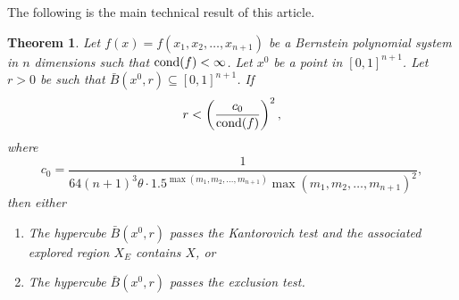 \documentclass{article}
\newcommand{\cond}[1]{\mathop{\rm{cond}}(#1)}
\newtheorem{theorem}{Theorem}[section]
\begin{document}
The following is the main technical result of this article.
\begin{theorem}
\label{thm2} Let $f(x)=f(x_1,x_2,\ldots,x_{n+1})$ be a Bernstein polynomial system in $n$ dimensions such that $\cond{f}<\infty$.
Let $x^0$ be a point in $[0,1]^{n+1}$.
Let $r > 0$ be such that $\bar{B}(x^0,r) \subseteq [0,1]^{n+1}$. If
\begin{equation}
\label{deltahatcond}
r < \left(\frac{c_0}{\cond{f}}\right)^2,
\end{equation}
where
\begin{equation}
c_0=\frac{1}{64(n+1)^3\theta\cdot 1.5^{\max(m_1,m_2,\ldots,m_{n+1})}\max(m_1,m_2,\ldots,m_{n+1})^2},
\label{eq:k0def}
\end{equation}
then either
\begin{enumerate}
\item The hypercube $\bar{B}(x^0,r)$ passes the Kantorovich test
and the associated explored region $X_E$ contains $X$, or 
\item
The hypercube $\bar{B}(x^0,r)$ passes the exclusion test.
\end{enumerate}
\end{theorem}
\end{document}
